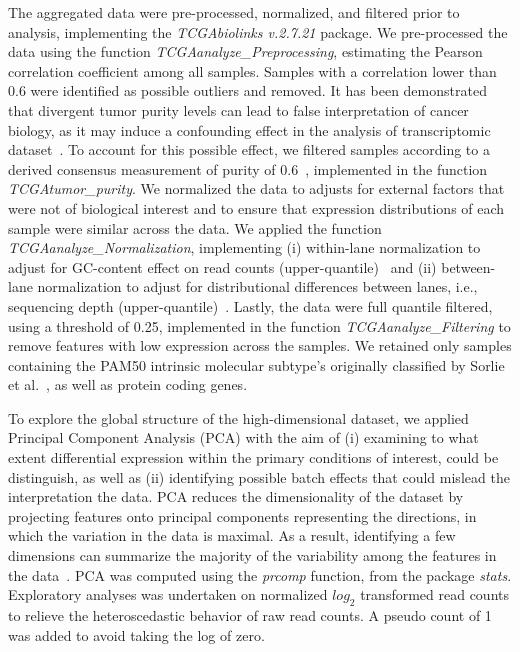 \documentclass[10pt,letterpaper]{article}
\begin{document}
The aggregated data were pre-processed, normalized, and filtered prior to analysis, implementing the \textit{TCGAbiolinks v.2.7.21} package. We pre-processed the data using the function \textit{TCGAanalyze\_Preprocessing}, estimating the Pearson correlation coefficient among all samples. Samples with a correlation lower than 0.6 were identified as possible outliers and removed.
It has been demonstrated that divergent tumor purity levels can lead to false interpretation of cancer biology, as it may induce a confounding effect in the analysis of transcriptomic dataset~\cite{Aran2015}. To account for this possible effect, we filtered samples according to a derived consensus measurement of purity of 0.6~\cite{Aran2015}, implemented in the function \textit{TCGAtumor\_purity}.
We normalized the data to adjusts for external factors that were not of biological interest and to ensure that expression distributions of each sample were similar across the data. We applied the function \textit{TCGAanalyze\_Normalization}, implementing (i) within-lane normalization to adjust for GC-content effect on read counts (upper-quantile)~\cite{Risso2011} and (ii) between-lane normalization to adjust for distributional differences between lanes, i.e., sequencing depth (upper-quantile)~\cite{Bullard2010}.
Lastly, the data were full quantile filtered, using a threshold of 0.25, implemented in the function \textit{TCGAanalyze\_Filtering} to remove features with low expression across the samples.
We retained only samples containing the PAM50 intrinsic molecular subtype's originally classified by Sorlie et al.~\cite{Sorlie2001}, as well as protein coding genes.

To explore the global structure of the high-dimensional dataset, we applied Principal Component Analysis (PCA) with the aim of (i) examining to what extent differential expression within the primary conditions of interest, could be distinguish, as well as (ii) identifying possible batch effects that could mislead the interpretation the data. PCA reduces the dimensionality of the dataset by projecting features onto principal components representing the directions, in which the variation in the data is maximal. As a result, identifying a few dimensions can summarize the majority of the variability among the features in the data~\cite{Ringner2008}. PCA was computed using the \textit{prcomp} function, from the package \textit{stats}. 
Exploratory analyses was undertaken on normalized $log_{2}$ transformed read counts to relieve the heteroscedastic behavior of raw read counts. A pseudo count of 1 was added to avoid taking the log of zero.
\end{document}
